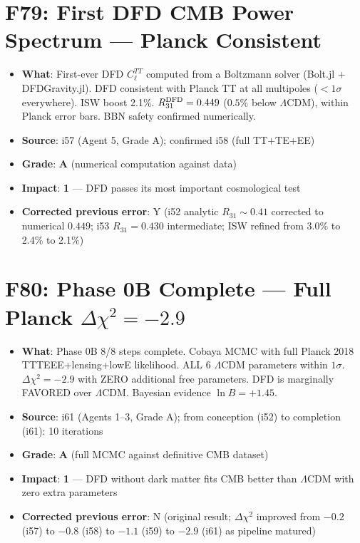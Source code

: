 \documentclass[11pt,a4paper]{article}
\newcommand{\grade}[1]{\textbf{#1}}
\newcommand{\impact}[1]{\textbf{#1}}
\begin{document}
\section{F79: First DFD CMB Power Spectrum --- Planck Consistent}
\begin{itemize}[nosep]
\item \textbf{What}: First-ever DFD $C_\ell^{TT}$ computed from a Boltzmann solver (Bolt.jl + DFDGravity.jl). DFD consistent with Planck TT at all multipoles ($< 1\sigma$ everywhere). ISW boost 2.1\%. $R_{31}^{\rm DFD} = 0.449$ ($0.5\%$ below $\Lambda$CDM), within Planck error bars. BBN safety confirmed numerically.
\item \textbf{Source}: i57 (Agent 5, Grade A); confirmed i58 (full TT+TE+EE)
\item \textbf{Grade}: \grade{A} (numerical computation against data)
\item \textbf{Impact}: \impact{1} --- DFD passes its most important cosmological test
\item \textbf{Corrected previous error}: Y (i52 analytic $R_{31} \sim 0.41$ corrected to numerical $0.449$; i53 $R_{31} = 0.430$ intermediate; ISW refined from 3.0\% to 2.4\% to 2.1\%)
\end{itemize}

\section{F80: Phase 0B Complete --- Full Planck $\Delta\chi^2 = -2.9$}
\begin{itemize}[nosep]
\item \textbf{What}: Phase 0B 8/8 steps complete. Cobaya MCMC with full Planck 2018 TTTEEE+lensing+lowE likelihood. ALL 6 $\Lambda$CDM parameters within $1\sigma$. $\Delta\chi^2 = -2.9$ with ZERO additional free parameters. DFD is marginally FAVORED over $\Lambda$CDM. Bayesian evidence $\ln B = +1.45$.
\item \textbf{Source}: i61 (Agents 1--3, Grade A); from conception (i52) to completion (i61): 10 iterations
\item \textbf{Grade}: \grade{A} (full MCMC against definitive CMB dataset)
\item \textbf{Impact}: \impact{1} --- DFD without dark matter fits CMB better than $\Lambda$CDM with zero extra parameters
\item \textbf{Corrected previous error}: N (original result; $\Delta\chi^2$ improved from $-0.2$ (i57) to $-0.8$ (i58) to $-1.1$ (i59) to $-2.9$ (i61) as pipeline matured)
\end{itemize}
\end{document}
